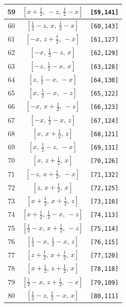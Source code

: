 \documentclass[fleqn,8pt]{jsarticle}
\begin{document}
\begin{longtable}{ccc}
59 & $\left[ x + \frac{1}{2},\, - z,\, \frac{1}{2} - x \right]$ & {\tt [59,141]} \\ \hline
60 & $\left[ \frac{1}{2} - z,\, x,\, \frac{1}{2} - x \right]$ & {\tt [60,143]} \\ \hline
61 & $\left[ - x,\, z + \frac{1}{2},\, - x \right]$ & {\tt [61,127]} \\ \hline
62 & $\left[ - x,\, \frac{1}{2} - z,\, x \right]$ & {\tt [62,129]} \\ \hline
63 & $\left[ - z,\, \frac{1}{2} - x,\, x \right]$ & {\tt [63,128]} \\ \hline
64 & $\left[ z,\, \frac{1}{2} - x,\, - x \right]$ & {\tt [64,130]} \\ \hline
65 & $\left[ x,\, \frac{1}{2} - x,\, - z \right]$ & {\tt [65,122]} \\ \hline
66 & $\left[ - x,\, x + \frac{1}{2},\, - z \right]$ & {\tt [66,123]} \\ \hline
67 & $\left[ - x,\, \frac{1}{2} - x,\, z \right]$ & {\tt [67,124]} \\ \hline
68 & $\left[ x,\, x + \frac{1}{2},\, z \right]$ & {\tt [68,121]} \\ \hline
69 & $\left[ x,\, \frac{1}{2} - z,\, - x \right]$ & {\tt [69,131]} \\ \hline
70 & $\left[ x,\, z + \frac{1}{2},\, x \right]$ & {\tt [70,126]} \\ \hline
71 & $\left[ - z,\, x + \frac{1}{2},\, - x \right]$ & {\tt [71,132]} \\ \hline
72 & $\left[ z,\, x + \frac{1}{2},\, x \right]$ & {\tt [72,125]} \\ \hline
73 & $\left[ x + \frac{1}{2},\, x + \frac{1}{2},\, z \right]$ & {\tt [73,116]} \\ \hline
74 & $\left[ x + \frac{1}{2},\, \frac{1}{2} - x,\, - z \right]$ & {\tt [74,113]} \\ \hline
75 & $\left[ \frac{1}{2} - x,\, x + \frac{1}{2},\, - z \right]$ & {\tt [75,114]} \\ \hline
76 & $\left[ \frac{1}{2} - x,\, \frac{1}{2} - x,\, z \right]$ & {\tt [76,115]} \\ \hline
77 & $\left[ z + \frac{1}{2},\, x + \frac{1}{2},\, x \right]$ & {\tt [77,120]} \\ \hline
78 & $\left[ x + \frac{1}{2},\, z + \frac{1}{2},\, x \right]$ & {\tt [78,118]} \\ \hline
79 & $\left[ \frac{1}{2} - x,\, z + \frac{1}{2},\, - x \right]$ & {\tt [79,109]} \\ \hline
80 & $\left[ \frac{1}{2} - z,\, \frac{1}{2} - x,\, x \right]$ & {\tt [80,111]} \\ \hline

\end{longtable}
\end{document}
